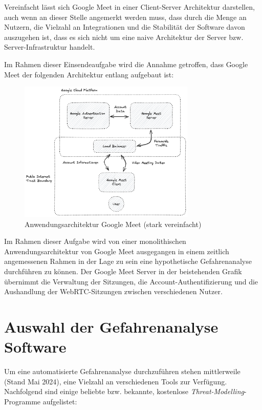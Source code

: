 \documentclass{article}
\begin{document}
Vereinfacht lässt sich Google Meet in einer Client-Server Architektur darstellen, auch 
wenn an dieser Stelle angemerkt werden muss, dass durch die Menge an Nutzern, die Vielzahl 
an Integrationen und die Stabilität der Software davon auszugehen ist, dass es sich nicht 
um eine naive Architektur der Server bzw. Server-Infrastruktur handelt. 

Im Rahmen dieser Einsendeaufgabe wird die Annahme getroffen, dass Google Meet der 
folgenden Architektur entlang aufgebaut ist:

\begin{figure}[H]
	\includegraphics[width=0.75\textwidth]{./google-meet-diagram.png}
	\centering
	\caption{Anwendungsarchitektur Google Meet (stark vereinfacht)}
\end{figure}

Im Rahmen dieser Aufgabe wird von einer monolithischen Anwendungsarchitektur von Google 
Meet ausgegangen in einem zeitlich angemessenen Rahmen in der Lage zu sein eine 
hypothetische Gefahrenanalyse durchführen zu können. Der Google Meet Server in der 
beistehenden Grafik übernimmt die Verwaltung der Sitzungen, die Account-Authentifizierung 
und die Aushandlung der WebRTC-Sitzungen zwischen verschiedenen Nutzer.

\section{Auswahl der Gefahrenanalyse Software}

Um eine automatisierte Gefahrenanalyse durchzuführen stehen mittlerweile (Stand Mai 2024), 
eine Vielzahl an verschiedenen Tools zur Verfügung. Nachfolgend sind einige beliebte 
bzw. bekannte, kostenlose \textit{Threat-Modelling}-Programme aufgelistet:
\end{document}
